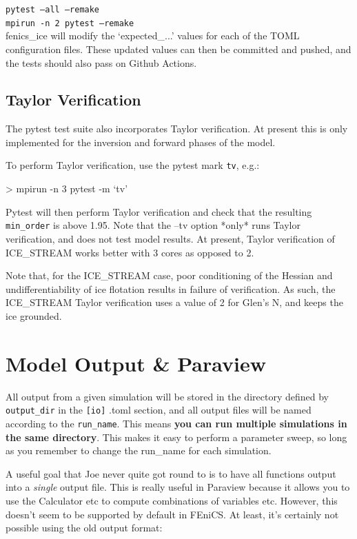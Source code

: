 \documentclass[11pt, reqno, nocenter]{article}
\begin{document}
\texttt{pytest --all --remake}\\
\texttt{mpirun -n 2 pytest --remake}\\

fenics\_ice will modify the `expected\_...' values for each of the TOML configuration files. These updated values can then be committed and pushed, and the tests should also pass on Github Actions.

\subsection{Taylor Verification}

The pytest test suite also incorporates Taylor verification. At present this is only implemented for the inversion and forward phases of the model.

To perform Taylor verification, use the pytest mark \texttt{tv}, e.g.:
\begin{spverbatim}
> mpirun -n 3 pytest -m `tv'
\end{spverbatim}

Pytest will then perform Taylor verification and check that the resulting \texttt{min\_order} is above 1.95. Note that the --tv option *only* runs Taylor verification, and does not test model results. At present, Taylor verification of ICE\_STREAM works better with 3 cores as opposed to 2.

Note that, for the ICE\_STREAM case, poor conditioning of the Hessian and undifferentiability of ice flotation results in failure of verification. As such, the ICE\_STREAM Taylor verification uses a value of 2 for Glen's N, and keeps the ice grounded.

\section{Model Output \& Paraview}

All output from a given simulation will be stored in the directory defined by \texttt{output\_dir} in the \texttt{[io]} .toml section, and all output files will be named according to the \texttt{run\_name}. This means \textbf{you can run multiple simulations in the same directory}. This makes it easy to perform a parameter sweep, so long as you remember to change the run\_name for each simulation.

A useful goal that Joe never quite got round to is to have all functions output into a \emph{single} output file. This is really useful in Paraview because it allows you to use the Calculator etc to compute combinations of variables etc. However, this doesn't seem to be supported by default in FEniCS. At least, it's certainly not possible using the old output format:
\end{document}
